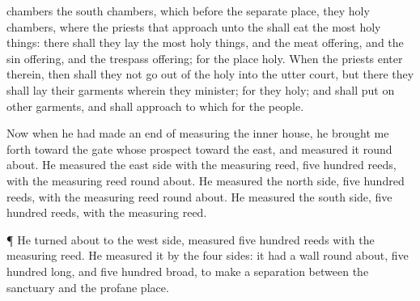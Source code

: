 {chambers
{} the
south
chambers, which
{}
before the separate
place, they
{}
holy
chambers, where the
priests that
approach unto the
{} shall
eat the
most holy
things: there shall they
lay the
most holy
things, and the meat
offering, and the sin
offering, and the trespass
offering; for the
place
{}
holy.
When the
priests
enter therein, then shall they not go
out of the
holy
{} into the
utter
court, but there they shall
lay their
garments wherein they
minister; for they
{}
holy; and shall
put on
other
garments, and shall
approach to
{} which
{} for the
people.
\par }{\PP {}Now when he had made an
end of
measuring the
inner
house, he brought me
forth
toward the
gate whose
prospect
{}
toward the
east, and
measured it round
about.
He
measured the
east
side with the
measuring
reed,
five
hundred
reeds, with the
measuring
reed round
about.
He
measured the
north
side,
five
hundred
reeds, with the
measuring
reed round
about.
He
measured the
south
side,
five
hundred
reeds, with the
measuring
reed.
\par }{\PP {}¶ He turned
about to the
west
side,
{}
measured
five
hundred
reeds with the
measuring
reed.
He
measured it by the
four
sides: it had a
wall round
about,
five
hundred
{}
long, and
five
hundred
broad, to make a
separation between the
sanctuary and the profane
place.

}
